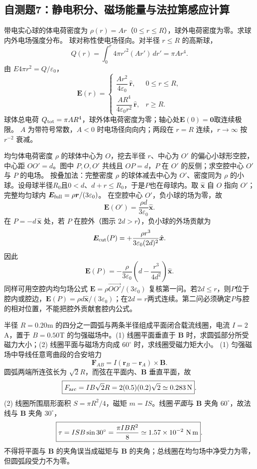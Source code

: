 \subsection{自测题7：静电积分、磁场能量与法拉第感应计算}

\problemtext 带电实心球的体电荷密度为 $\rho(r)=Ar$（$0\le r\le R$），球外电荷密度为零。求球内外电场强度分布。
\workings 球对称性使电场径向。对半径 $r\le R$ 的高斯球，
\[Q(r)=\int_0^r 4\pi r'^2(Ar')\,dr'=\pi A r^4.\]
由 $E4\pi r^2=Q/\varepsilon_0$，
\[
\boxed{\bm E(r)=
\begin{cases}
\dfrac{A r^2}{4\varepsilon_0}\,\hat{\bm r},&0\le r\le R,\\[4pt]
\dfrac{A R^4}{4\varepsilon_0r^2}\,\hat{\bm r},&r\ge R.
\end{cases}}
\]
球体总电荷 $Q_{\rm tot}=\pi AR^4$，球外体电荷密度为零；轴心处$\bm E(0)=\bm0$取连续极限。
\crosscheck $A$ 为带符号常数，$A<0$ 时电场径向向内；两段在 $r=R$ 连续，$r\to\infty$ 按 $r^{-2}$ 衰减。

\problemtext 均匀体电荷密度 $\rho$ 的球体中心为 $O$，挖去半径 $r$、中心为 $O'$ 的偏心小球形空腔，中心距 $OO'=d$。图中 $P,O,O'$ 共线且 $OP=d$，$P$ 在 $O'$ 的反侧；求空腔中心 $O'$ 与 $P$ 的电场。
\workings 按叠加法：完整密度 $\rho$ 的球体减去中心为 $O'$、密度同为 $\rho$ 的小球。设母球半径$R_0$且$0<d$、$d+r\le R_0$，于是$P$也在母球内。取 $\hat{\bm x}$ 自 $O$ 指向 $O'$；完整均匀球内 $\bm E_{\rm full}=\rho\bm r/(3\varepsilon_0)$。
在空腔中心 $O'$，负小球的场为零，故
\[\boxed{\bm E(O')=\frac{\rho d}{3\varepsilon_0}\hat{\bm x}}.\]
在 $P=-d\,\hat{\bm x}$ 处，若 $P$ 在腔外（图示 $2d>r$），负小球的外场贡献为
\[\bm E_{\rm cut}(P)=+\frac{\rho r^3}{3\varepsilon_0(2d)^2}\hat{\bm x}.\]
因此
\[\boxed{\bm E(P)=-\frac{\rho}{3\varepsilon_0}
\left(d-\frac{r^3}{4d^2}\right)\hat{\bm x}}.\]
\crosscheck 同样可用空腔内均匀场公式 $\bm E=\rho\overrightarrow{OO'}/(3\varepsilon_0)$ 复核第一问。若$2d\le r$，则$P$位于腔内或腔边，$\bm E(P)=\rho d\hat{\bm x}/(3\varepsilon_0)$；在$2d=r$两式连续。第二问必须确定$P$与腔的相对位置，不能把腔外贡献套腔内公式。

\problemtext 半径 $R=0.20$m 的四分之一圆弧与两条半径组成平面闭合载流线圈，电流 $I=2$A，置于 $B=0.50$T 的匀强磁场中。(1) 线圈平面垂直于 $\bm B$ 时，求圆弧部分所受磁力大小；(2) 线圈平面与磁场方向成 $60^\circ$ 时，求线圈受磁力矩大小。
\workings (1) 匀强磁场中导线任意弯曲段的合安培力
\[\bm F_{AB}=I(\bm r_B-\bm r_A)\times\bm B.\]
圆弧两端所连弦长为 $\sqrt2R$，而弦在平面内、$\bm B$ 垂直平面，故
\[\boxed{F_{\rm arc}=IB\sqrt2R=2(0.5)(0.2)\sqrt2\simeq0.283\,{\rm N}}.\]
(2) 线圈所围扇形面积 $S=\pi R^2/4$，磁矩 $m=IS$。线圈\emph{平面}与 $\bm B$ 夹角 $60^\circ$，故法线与 $\bm B$ 夹角 $30^\circ$，
\[\boxed{\tau=ISB\sin30^\circ=\frac{\pi IBR^2}{8}
\simeq1.57\times10^{-2}\ {\rm N\,m}}.\]
\crosscheck 不得将平面与 $\bm B$ 的夹角误当成磁矩与 $\bm B$ 的夹角；总线圈在均匀场中净受力为零，但圆弧段受力不为零。

